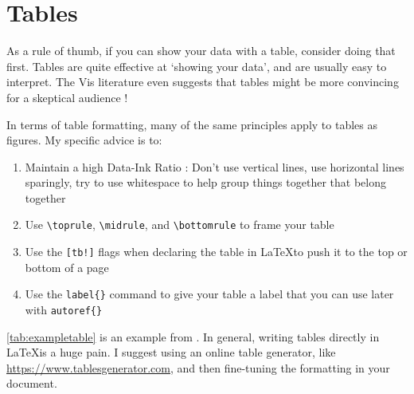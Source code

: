 %
%
\newpage
\section{Tables}

As a rule of thumb, if you can show your data with a table, consider doing that first. Tables are quite effective at `showing your data', and are usually easy to interpret. The Vis literature even suggests that tables might be more convincing for a skeptical audience \citep{pandey2014persuasive}!

In terms of table formatting, many of the same principles apply to tables as figures. My specific advice is to: 

\begin{enumerate}
    \item Maintain a high Data-Ink Ratio \citep{tufte1983visual}: Don't use vertical lines, use horizontal lines sparingly, try to use whitespace to help group things together that belong together
    \item Use \texttt{\textbackslash toprule}, \texttt{\textbackslash midrule}, and \texttt{\textbackslash bottomrule} to frame your table
    \item Use the \texttt{[tb!]} flags when declaring the table in \LaTeX to push it to the top or bottom of a page
    \item Use the \texttt{label\{\}} command to give your table a label that you can use later with \texttt{autoref\{\}}
\end{enumerate}

\autoref{tab:exampletable} is an example from \citet{wallace2013}. In general, writing tables directly in \LaTeX is a huge pain. I suggest using an online table generator, like \href{https://www.tablesgenerator.com}{https://www.tablesgenerator.com}, and then fine-tuning the formatting in your document. 

